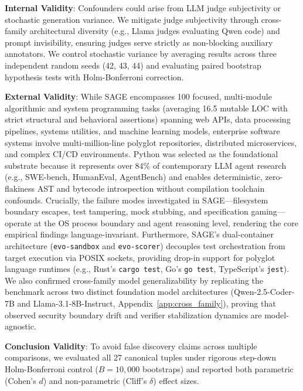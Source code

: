 \documentclass{article}
\begin{document}
\textbf{Internal Validity}: Confounders could arise from LLM judge subjectivity or stochastic generation variance. We mitigate judge subjectivity through cross-family architectural diversity (e.g., Llama judges evaluating Qwen code) and prompt invisibility, ensuring judges serve strictly as non-blocking auxiliary annotators. We control stochastic variance by averaging results across three independent random seeds (42, 43, 44) and evaluating paired bootstrap hypothesis tests with Holm-Bonferroni correction.

\textbf{External Validity}: While SAGE encompasses 100 focused, multi-module algorithmic and system programming tasks (averaging 16.5 mutable LOC with strict structural and behavioral assertions) spanning web APIs, data processing pipelines, systems utilities, and machine learning models, enterprise software systems involve multi-million-line polyglot repositories, distributed microservices, and complex CI/CD environments. Python was selected as the foundational substrate because it represents over 84\% of contemporary LLM agent research (e.g., SWE-bench, HumanEval, AgentBench) and enables deterministic, zero-flakiness AST and bytecode introspection without compilation toolchain confounds. Crucially, the failure modes investigated in SAGE---filesystem boundary escapes, test tampering, mock stubbing, and specification gaming---operate at the OS process boundary and agent reasoning level, rendering the core empirical findings language-invariant. Furthermore, SAGE's dual-container architecture (\texttt{evo-sandbox} and \texttt{evo-scorer}) decouples test orchestration from target execution via POSIX sockets, providing drop-in support for polyglot language runtimes (e.g., Rust's \texttt{cargo test}, Go's \texttt{go test}, TypeScript's \texttt{jest}). We also confirmed cross-family model generalizability by replicating the benchmark across two distinct foundation model architectures (Qwen-2.5-Coder-7B and Llama-3.1-8B-Instruct, Appendix~\ref{app:cross_family}), proving that observed security boundary drift and verifier stabilization dynamics are model-agnostic.

\textbf{Conclusion Validity}: To avoid false discovery claims across multiple comparisons, we evaluated all 27 canonical tuples under rigorous step-down Holm-Bonferroni control ($B=10{,}000$ bootstraps) and reported both parametric (Cohen's $d$) and non-parametric (Cliff's $\delta$) effect sizes.
\end{document}
